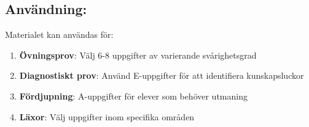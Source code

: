 \documentclass[12pt]{article}
\begin{document}
\subsection*{Användning:}
Materialet kan användas för:
\begin{enumerate}
    \item \textbf{Övningsprov}: Välj 6-8 uppgifter av varierande svårighetsgrad
    \item \textbf{Diagnostiskt prov}: Använd E-uppgifter för att identifiera kunskapsluckor
    \item \textbf{Fördjupning}: A-uppgifter för elever som behöver utmaning
    \item \textbf{Läxor}: Välj uppgifter inom specifika områden
\end{enumerate}
\end{document}
